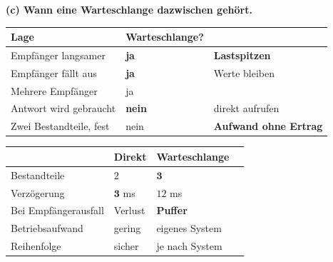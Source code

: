 \begin{aufgabe}
\medskip
\textbf{(c) Wann eine Warteschlange dazwischen gehört.}

\begin{center}
{\small
\renewcommand{\arraystretch}{1.5}
\begin{tabular}{@{}P{3.0cm}P{2.6cm}P{2.2cm}@{}}
\toprule
\textbf{Lage} & \textbf{Warte\-schlange?} & \\
\midrule
Empfänger langsamer & \textcolor{gruen}{\textbf{ja}} & \textbf{Lastspitzen}\\
Empfänger fällt aus & \textcolor{gruen}{\textbf{ja}} & \textcolor{gruen}{Werte bleiben}\\
Mehrere Empfänger & \textcolor{gruen}{ja} & \\
Antwort wird gebraucht & \textcolor{akzent}{\textbf{nein}} & \textcolor{akzent}{direkt aufrufen}\\
Zwei Bestandteile, fest & \textcolor{akzent}{nein} & \textcolor{akzent}{\textbf{Aufwand ohne Ertrag}}\\
\bottomrule
\end{tabular}}
\end{center}

\begin{center}
\begin{minipage}{0.88\textwidth}
\end{minipage}
\end{center}

\begin{center}
\renewcommand{\arraystretch}{1.45}
\begin{tabular}{@{}P{2.8cm}P{1.8cm}P{2.6cm}P{1.6cm}@{}}
\toprule
& \textbf{Direkt} & \textbf{Warte\-schlange} & \\
\midrule
Bestandteile & $2$ & $\mathbf{3}$ & \\
Verzöge\-rung & $\mathbf{3}$ ms & $12$ ms & \\
Bei Empfängerausfall & \textcolor{akzent}{Verlust} & \textcolor{gruen}{\textbf{Puffer}} & \\
Betriebs\-aufwand & \textcolor{gruen}{gering} & \textcolor{akzent}{eigenes System} & \\
Reihenfolge & \textcolor{gruen}{sicher} & \textcolor{mittel}{je nach System} & \\
\bottomrule
\end{tabular}
\end{center}


\end{aufgabe}
